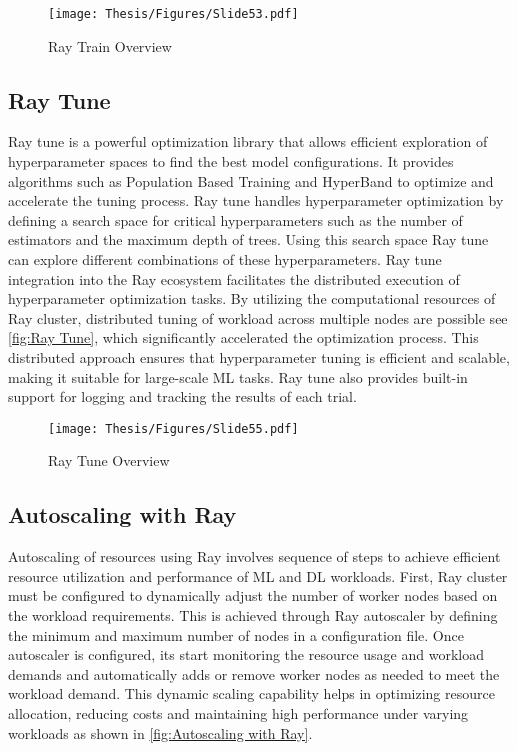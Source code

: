 \begin{figure}[h]
\centering
\texttt{[image: Thesis/Figures/Slide53.pdf]}
\caption{\label{fig:Ray Train}Ray Train Overview \cite{ray_doc}}
\end{figure}


\subsection{Ray Tune}

Ray tune is a powerful optimization library that allows efficient exploration of hyperparameter spaces to find the best model configurations. It provides algorithms such as Population Based Training  and HyperBand to optimize and accelerate the tuning process.  Ray tune handles hyperparameter optimization by defining a search space for critical hyperparameters such as the number of estimators and the maximum depth of trees. Using this search space Ray tune can explore different combinations of these hyperparameters. Ray tune integration into the Ray ecosystem facilitates the distributed execution of hyperparameter optimization tasks. By utilizing the computational resources of Ray cluster, distributed tuning of workload across multiple nodes are possible see \autoref{fig:Ray Tune}, which significantly accelerated the optimization process. This distributed approach ensures that hyperparameter tuning is efficient and scalable, making it suitable for large-scale ML tasks. Ray tune also provides built-in support for logging and tracking the results of each trial. \cite{ray_doc}


\clearpage

\begin{figure}[h]
\centering
\texttt{[image: Thesis/Figures/Slide55.pdf]}
\caption{\label{fig:Ray Tune}Ray Tune Overview \cite{ray_doc}}
\end{figure}



\subsection{Autoscaling with Ray}

Autoscaling of resources using Ray involves sequence of steps to achieve efficient resource utilization and performance of ML and DL workloads. First, Ray cluster must be configured to dynamically adjust the number of worker nodes based on the workload requirements. This is achieved through Ray autoscaler by defining the minimum and maximum number of nodes in a configuration file. Once autoscaler is configured, its start monitoring the resource usage and workload demands and automatically adds or remove worker nodes as needed to meet the workload demand. This dynamic scaling capability helps in optimizing resource allocation, reducing costs and maintaining high performance under varying workloads as shown in \autoref{fig:Autoscaling with Ray}. \cite{moritz}

